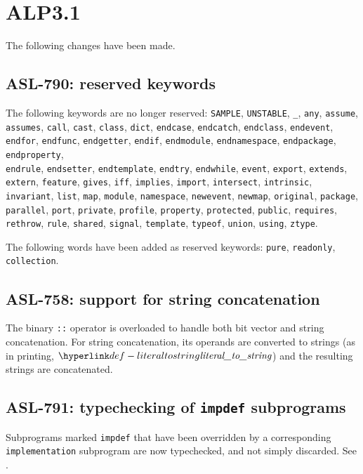 \section{ALP3.1}

The following changes have been made.

\subsection{ASL-790: reserved keywords}
The following keywords are no longer reserved:
%
\texttt{SAMPLE},
\texttt{UNSTABLE},
\texttt{\_},
\texttt{any},
\texttt{assume},
\texttt{assumes},
\texttt{call},
\texttt{cast},
\texttt{class},
\texttt{dict},
\texttt{endcase},
\texttt{endcatch},
\texttt{endclass},
\texttt{endevent},
\texttt{endfor},
\texttt{endfunc},
\texttt{endgetter},
\texttt{endif},
\texttt{endmodule},
\texttt{endnamespace},
\texttt{endpackage},
\texttt{endproperty},\\
\texttt{endrule},
\texttt{endsetter},
\texttt{endtemplate},
\texttt{endtry},
\texttt{endwhile},
\texttt{event},
\texttt{export},
\texttt{extends},
\texttt{extern},
\texttt{feature},
\texttt{gives},
\texttt{iff},
\texttt{implies},
\texttt{import},
\texttt{intersect},
\texttt{intrinsic},
\texttt{invariant},
\texttt{list},
\texttt{map},
\texttt{module},
\texttt{namespace},
\texttt{newevent},
\texttt{newmap},
\texttt{original},
\texttt{package},
\texttt{parallel},
\texttt{port},
\texttt{private},
\texttt{profile},
\texttt{property},
\texttt{protected},
\texttt{public},
\texttt{requires},
\texttt{rethrow},
\texttt{rule},
\texttt{shared},
\texttt{signal},
\texttt{template},
\texttt{typeof},
\texttt{union},
\texttt{using},
\texttt{ztype}.

The following words have been added as reserved keywords:
\texttt{pure}, \texttt{readonly}, \texttt{collection}.

\subsection{ASL-758: support for string concatenation}
The binary \texttt{::} operator is overloaded to handle both bit vector and string concatenation.
For string concatenation, its operands are converted to strings (as in printing, $\literaltostring$) and the resulting strings are concatenated.

\subsection{ASL-791: typechecking of \texttt{impdef} subprograms}
Subprograms marked \texttt{impdef} that have been overridden by a corresponding \texttt{implementation} subprogram are now typechecked, and not simply discarded.
See .

